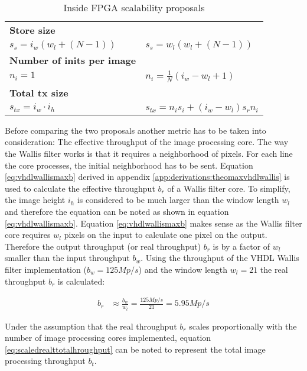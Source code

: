\begin{table}[b!]
\begin{tabular}{p{} p{}}
        \textbf{Store size} & \\
        {\( 
            s_s  = i_w(w_l+(N-1))
        \)}
        &
        {\( 
            s_s  = w_l(w_l+(N-1))
        \)}
        \\\midrule
        \textbf{Number of inits per image} & \\
        {\( 
            n_i  = 1
        \)}
        &
        {\( 
            n_i  = \frac{1}{N}(i_w-w_l+1)
        \)}
        \\\midrule
        \textbf{Total tx size} & \\
        {\( 
            s_{tx}  = i_w \cdot i_h
        \)}
        &
        {\( 
            s_{tx}  = n_i s_i + (i_w-w_l)s_r n_i
        \)}
        \\
        \bottomrule
    \end{tabular}
    \caption{Inside FPGA scalability proposals}
    \label{tab:insidefpgascalability}
\end{table}
\clearpage
Before comparing the two proposals another metric has to be taken into
consideration: The effective throughput of the image processing core. The way
the Wallis filter works is that it requires a neighborhood of pixels. For each
line the core processes, the initial neighborhood has to be sent. Equation
\ref{eq:vhdlwallismaxb} derived in appendix 
\ref{app:derivations:theomaxvhdlwallis} is used to calculate the effective
throughput $b_r$ of a Wallis filter core. To simplify, the image height $i_h$ is
considered to be much larger than the window length $w_l$ and therefore the
equation can be noted as shown in equation \ref{eq:vhdlwallismaxb}.
Equation \ref{eq:vhdlwallismaxb} makes sense as the Wallis filter core
requires $w_l$ pixels on the input to calculate one pixel on the output.
Therefore the output throughput (or real throughput) $b_r$ is by a factor of $w_l$
smaller than the input throughput $b_w$. Using the
throughput of the VHDL Wallis filter implementation ($b_w=125Mp/s$) and the
window length $w_l=21$ the real throughput $b_r$ is calculated:

\begin{align}
    b_r  & \approx \frac{b_w}{w_l} = \frac{125Mp/s}{21} = 5.95 Mp/s
    \label{eq:vhdlwallismaxb}
\end{align}

Under the assumption that the real throughput $b_r$ scales proportionally with the
number of image processing cores implemented, equation 
\ref{eq:scaledrealttotalhroughput} can be noted to represent the total image
processing throughput $b_t$.

